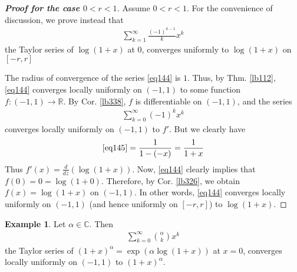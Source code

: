 \documentclass[12pt,b5paper,notitlepage]{article}
\theoremstyle{definition}
\newtheorem{eg}[df]{Example}
\theoremstyle{plain}
\newcommand{\Cbb}{\mathbb C}
\newcommand{\Rbb}{\mathbb R}
\numberwithin{equation}{section}
\begin{document}
\begin{proof}[\textbf{Proof for the case $0<r<1$}]
Assume $0<r<1$. For the convenience of discussion, we prove instead that 
\begin{align}
\sum_{k=1}^\infty \frac{(-1)^{k-1}}{k} x^k  \label{eq144}
\end{align}
the Taylor series of $\log(1+x)$ at $0$, converges uniformly to $\log(1+x)$ on $[-r,r]$

The radius of convergence of the series \eqref{eq144} is $1$. Thus, by Thm. \ref{lb112}, \eqref{eq144} converges locally uniformly on $(-1,1)$ to some function $f:(-1,1)\rightarrow\Rbb$. By Cor. \ref{lb338}, $f$ is differentiable on $(-1,1)$, and the series
\begin{align}
\sum_{k=0}^\infty (-1)^kx^k   \label{eq145}
\end{align}
converges locally uniformly on $(-1,1)$ to $f'$. But we clearly have
\begin{align}
\eqref{eq145}=\frac{1}{1-(-x)}=\frac 1{1+x}
\end{align}
Thus $f'(x)=\frac d{dz}(\log(1+x))$. Now, \eqref{eq144} clearly implies that $f(0)=0=\log(1+0)$. Therefore, by Cor. \ref{lb326}, we obtain $f(x)=\log(1+x)$ on $(-1,1)$. In other words, \eqref{eq144} converges locally uniformly on $(-1,1)$ (and hence uniformly on $[-r,r]$) to $\log(1+x)$.
\end{proof}



\begin{eg}
Let $\alpha\in\Cbb$. Then
\begin{align}
\sum_{k=0}^\infty{\alpha\choose k}x^k   \label{eq146}
\end{align}
the Taylor series of $(1+x)^\alpha=\exp(\alpha\log(1+x))$ at $x=0$, converges locally uniformly on $(-1,1)$ to $(1+x)^\alpha$.
\end{eg}
\end{document}
